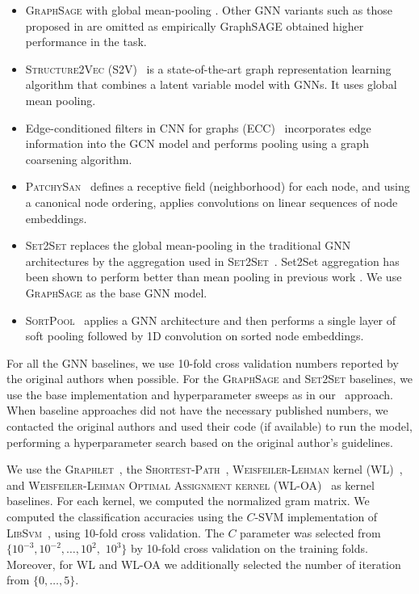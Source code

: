 \begin{itemize}[leftmargin=15pt, topsep=-5pt, parsep=0pt]
    \item \textsc{GraphSage} with global mean-pooling \cite{hamilton2017inductive}. Other GNN variants such as those proposed in \cite{kipf2017semi} are omitted as empirically GraphSAGE obtained higher performance in the task.
    \item \textsc{Structure2Vec} (\textsc{S2V})~\cite{dai2016discriminative} is a state-of-the-art graph representation learning algorithm that combines a latent variable model with GNNs. It uses global mean pooling.
    \item Edge-conditioned filters in CNN for graphs (\textsc{ECC})~\cite{simonovsky2017dynamic} incorporates edge information into the GCN model and performs pooling using a graph coarsening algorithm. %
    \item \textsc{PatchySan}~\cite{niepert2016learning} defines a receptive field (neighborhood) for each node, and using a canonical node ordering, applies convolutions on linear sequences of node embeddings. 
    \item \textsc{Set2Set} replaces the global mean-pooling in the traditional GNN architectures by the aggregation used in \textsc{Set2Set}~\cite{vinyals2015order}. Set2Set aggregation has been shown to perform better than mean pooling in previous work \cite{Gil+2017}. We use \textsc{GraphSage} as the base GNN model. 
    \item  \textsc{SortPool}~\cite{zhang2018end} applies a GNN architecture and then performs a single layer of soft pooling followed by 1D convolution on sorted node embeddings. 
\end{itemize}

\medskip
For all the GNN baselines, we use 10-fold cross validation numbers reported by the original authors when possible. 
For the \textsc{GraphSage} and \textsc{Set2Set} baselines, we use the base implementation and hyperparameter sweeps as in our \name\ approach.
When baseline approaches did not have the necessary published numbers, we contacted the original authors and used \textbf{}their code (if available) to run the model, performing a hyperparameter search based on the original author's guidelines. 

We use the \textsc{Graphlet}~\cite{She+2009}, the \textsc{Shortest-Path}~\cite{Borgwardt2005}, \textsc{Weisfeiler-Lehman} kernel (\textsc{WL})~\cite{She+2011}, and \textsc{Weisfeiler-Lehman Optimal Assignment kernel} (\textsc{WL-OA})~\cite{kriege2016valid} as kernel baselines. For each kernel, we computed the normalized gram matrix. We computed the classification accuracies using the $C$-SVM implementation of \textsc{LibSvm}~\cite{Cha+11}, using 10-fold cross validation. The $C$ parameter was selected from $\{10^{-3}, 10^{-2}, \dotsc, 10^{2},$ $10^{3}\}$ by 10-fold cross validation on the training folds. Moreover, for \textsc{WL} and \textsc{WL-OA} we additionally selected the number of iteration from $\{0, \dots, 5\}$.

